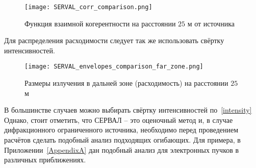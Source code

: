 \begin{figure}[H] 
	\centering 	\texttt{[image: SERVAL\_corr\_comparison.png]}
	\caption{Функция взаимной когерентности на расстоянии $25$ м от источника}
	\label{fig:SERVAL_corr_comparison}
\end{figure}
\noindent Для распределения расходимости следует так же использовать свёртку интенсивностей.
\begin{figure}[H] 
	\centering 	\texttt{[image: SERVAL\_envelopes\_comparison\_far\_zone.png]}
	\caption{Размеры излучения в дальней зоне (расходимость) на расстоянии $25$ м}
	\label{fig:SERVAL_envelopes_comparison_far_zone}
\end{figure}
В большинстве случаев можно выбирать свёртку интенсивностей по~\ref{intensity} Однако, стоит отметить, что СЕРВАЛ -- это оценочный метод и, в случае дифракционного ограниченного источника, необходимо перед проведением расчётов сделать подобный анализ подходящих огибающих. Для примера, в Приложении~\ref{AppendixA} дан подобный анализ для электронных пучков в различных приближениях.

